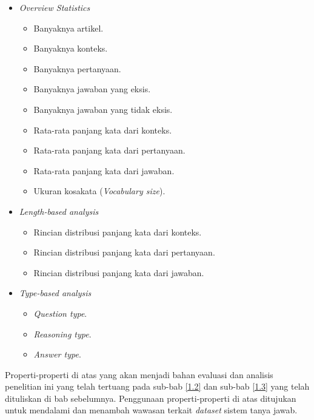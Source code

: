 \begin{itemize}

    \item \emph{Overview Statistics}

        \begin{itemize}
            \item Banyaknya artikel.
            \item Banyaknya konteks.
            \item Banyaknya pertanyaan.
            \item Banyaknya jawaban yang eksis.
            \item Banyaknya jawaban yang tidak eksis.
            \item Rata-rata panjang kata dari konteks.
            \item Rata-rata panjang kata dari pertanyaan.
            \item Rata-rata panjang kata dari jawaban.
            \item Ukuran kosakata (\emph{Vocabulary size}).
        \end{itemize}

    \item \emph{Length-based analysis}

        \begin{itemize}
            \item Rincian distribusi panjang kata dari konteks.
            \item Rincian distribusi panjang kata dari pertanyaan.
            \item Rincian distribusi panjang kata dari jawaban.
        \end{itemize}
        
    \item \emph{Type-based analysis}

        \begin{itemize}
            \item \emph{Question type}.
            \item \emph{Reasoning type}.
            \item \emph{Answer type}.
        \end{itemize}

\end{itemize}

Properti-properti di atas yang akan menjadi bahan evaluasi dan analisis penelitian ini yang telah tertuang pada sub-bab \ref{1.2} dan sub-bab \ref{1.3} yang telah dituliskan di bab sebelumnya. Penggunaan properti-properti di atas ditujukan untuk mendalami dan menambah wawasan terkait \emph{dataset} sistem tanya jawab.

